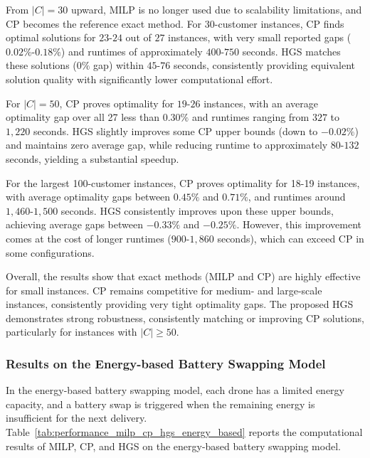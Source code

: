 \documentclass[3p, authoryear, 11pt]{elsarticle}
\begin{document}
From $|C|=30$ upward, MILP is no longer used due to scalability limitations, and CP becomes the reference exact method.
For 30-customer instances, CP finds optimal solutions for $23$-$24$ out of $27$ instances, with very small reported gaps ($0.02\%$-$0.18\%$) and runtimes of approximately $400$-$750$ seconds. HGS matches these solutions ($0\%$ gap) within $45$-$76$ seconds, consistently providing equivalent solution quality with significantly lower computational effort.

For $|C|=50$, CP proves optimality for $19$-$26$ instances, with an average optimality gap over all 27 less than $0.30\%$ and runtimes ranging from $327$ to $1,220$ seconds. 
HGS slightly improves some CP upper bounds (down to $-0.02\%$) and maintains zero average gap, while reducing runtime to approximately $80$-$132$ seconds, yielding a substantial speedup.

For the largest 100-customer instances, CP proves optimality for 18-19 instances, with average optimality gaps between $0.45\%$ and $0.71\%$, and runtimes around $1,460$-$1,500$ seconds. HGS consistently improves upon these upper bounds, achieving average gaps between $-0.33\%$ and $-0.25\%$. However, this improvement comes at the cost of longer runtimes ($900$-$1,860$ seconds), which can exceed CP in some configurations.

Overall, the results show that exact methods (MILP and CP) are highly effective for small instances. CP remains competitive for medium- and large-scale instances, consistently providing very tight optimality gaps. The proposed HGS demonstrates strong robustness, consistently matching or improving CP solutions, particularly for instances with $|C| \geq 50$.

\subsubsection{Results on the Energy-based Battery Swapping Model}
\label{sec:performance_energy_based}

\noindent
In the energy-based battery swapping model, each drone has a limited energy capacity, and a battery swap is triggered when the remaining energy is insufficient for the next delivery. 
Table~\ref{tab:performance_milp_cp_hgs_energy_based} reports the computational results of MILP, CP, and HGS on the energy-based battery swapping model.
\end{document}
